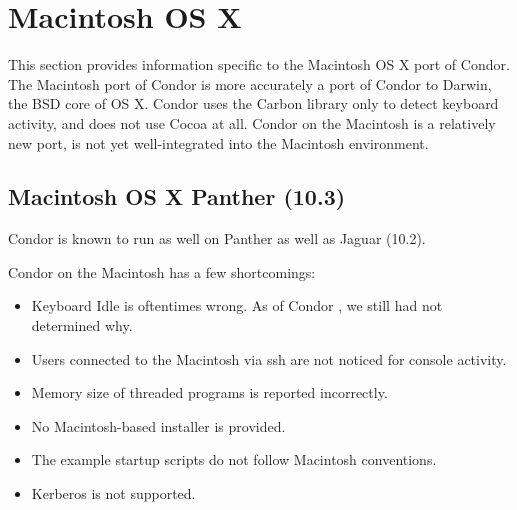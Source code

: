 \section{\label{sec:platform-linux}Macintosh OS X}

This section provides information specific to the Macintosh OS X port of
Condor.
The Macintosh port of Condor is more accurately a port of Condor to
Darwin, the BSD core of OS X. Condor uses the Carbon library only to
detect keyboard activity, and does not use Cocoa at all.
Condor on the Macintosh is a relatively new port, is not yet well-integrated
into the Macintosh environment. 
\subsection{\label{sec:platform-macos-panther}Macintosh OS X Panther (10.3)}

Condor \VersionNotice is known to run as well on Panther as well
as Jaguar (10.2). 

Condor on the Macintosh has a few shortcomings:
\begin{itemize}
\item Keyboard Idle is oftentimes wrong. As of Condor \VersionNotice, we still
had not determined why. 
\item Users connected to the Macintosh via ssh are not noticed for console activity.
\item Memory size of threaded programs is reported incorrectly.
\item No Macintosh-based installer is provided.
\item The example startup scripts do not follow Macintosh conventions.
\item Kerberos is not supported.
\end{itemize}


